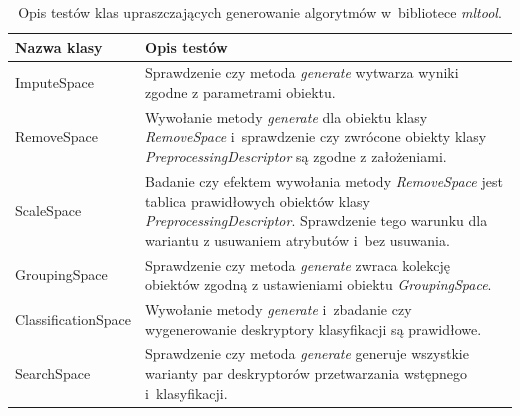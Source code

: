 \documentclass[../thesis.tex]{subfiles}
\begin{document}
\begin{table}[h]
\begin{center}
\begin{tabular}{ | l | p{110mm} | }
\hline
\rowcolor{lightgray} Nazwa klasy & Opis testów \\\hline

ImputeSpace & Sprawdzenie czy metoda \emph{generate} wytwarza wyniki zgodne z parametrami obiektu.\\\hline
RemoveSpace & Wywołanie metody \emph{generate} dla obiektu klasy \emph{RemoveSpace} i~sprawdzenie czy zwrócone obiekty klasy \emph{PreprocessingDescriptor} są zgodne z założeniami.\\\hline
ScaleSpace & Badanie czy efektem wywołania metody \emph{RemoveSpace} jest tablica prawidłowych obiektów klasy \emph{PreprocessingDescriptor}. Sprawdzenie tego warunku dla wariantu z usuwaniem atrybutów i~bez usuwania. \\\hline
GroupingSpace & Sprawdzenie czy metoda \emph{generate} zwraca kolekcję obiektów zgodną z ustawieniami obiektu \emph{GroupingSpace}.\\\hline
ClassificationSpace & Wywołanie metody \emph{generate} i~zbadanie czy wygenerowanie deskryptory klasyfikacji są prawidłowe.\\\hline
SearchSpace & Sprawdzenie czy metoda \emph{generate} generuje wszystkie warianty par deskryptorów przetwarzania wstępnego i~klasyfikacji.\\\hline

\end{tabular}
\caption{Opis testów klas upraszczających generowanie algorytmów w~bibliotece \emph{mltool}.}
\label{proj:table_mltool_spaces}
\end{center}
\end{table}
\end{document}

